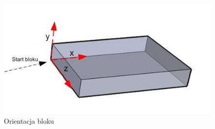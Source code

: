  \begin{figure}
\begin{center}
\includegraphics{osie.jpg} 
\caption { Orientacja bloku}
\label {osie}
\end{center}
\end{figure}
